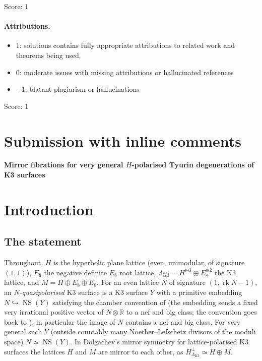 \documentclass[11pt]{article}
\newcommand{\NS}{\operatorname{NS}}
\newcommand{\rk}{\operatorname{rk}}
\newcommand{\LK}{\Lambda_{\mathrm{K3}}}
\theoremstyle{definition}
\theoremstyle{remark}
\begin{document}
\noindent Score: 1

\paragraph{Attributions.}
\begin{itemize}
	\item  1: solutions contains fully appropriate attributions
		to related work and theorems being used.
	\item  0: moderate issues with missing attributions or hallucinated references
	\item  $-1$: blatant plagiarism or hallucinations
\end{itemize}

\noindent Score: 1

\newpage
\section{Submission with inline comments}


\begin{center}
\textbf{Mirror fibrations for very general \(H\)-polarised Tyurin
degenerations of K3 surfaces}
\end{center}

\section{Introduction}

\subsection{The statement}

Throughout, \(H\) is the hyperbolic plane lattice (even, unimodular,
of signature \((1,1)\)), \(E_8\) the negative definite \(E_8\) root
lattice, \(\LK=H^{\oplus3}\oplus E_8^{\oplus2}\) the K3 lattice, and
\(M=H\oplus E_8\oplus E_8\). For an even lattice \(N\) of signature
\((1,\rk N-1)\), an \emph{\(N\)-quasipolarised} K3 surface is a K3
surface \(Y\) with a primitive embedding \(N\hookrightarrow\NS(Y)\)
satisfying the chamber convention of \cite[Definition~3.19]{GT} (the
embedding sends a fixed very irrational positive vector of
\(N\otimes\mathbb R\) to a nef and big class; the convention goes back
to \cite{Do}); in particular the image of \(N\) contains a nef and big
class. For very general such \(Y\) (outside countably
many Noether--Lefschetz divisors of the moduli space)
\(N\simeq\NS(Y)\). In Dolgachev's mirror symmetry for
lattice-polarised K3 surfaces \cite{Do} the lattices \(H\) and \(M\)
are mirror to each other, as \(H^\perp_{\LK}\simeq H\oplus M\).
\end{document}
